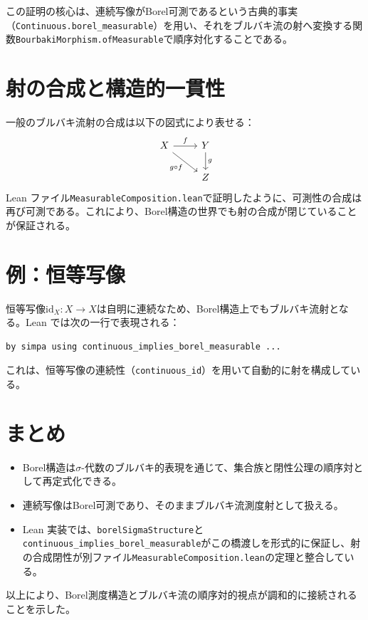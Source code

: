 \documentclass[a4paper]{ltjsarticle}
\begin{document}
この証明の核心は、連続写像がBorel可測であるという古典的事実（\verb|Continuous.borel_measurable|）を用い、それをブルバキ流の射へ変換する関数\verb|BourbakiMorphism.ofMeasurable|で順序対化することである。

\section{射の合成と構造的一貫性}
一般のブルバキ流射の合成は以下の図式により表せる：
\[
\begin{tikzcd}
X \arrow[r, "f"] \arrow[dr, "g \circ f"'] & Y \arrow[d, "g"] \\
 & Z
\end{tikzcd}
\]
Lean ファイル\texttt{MeasurableComposition.lean}で証明したように、可測性の合成は再び可測である。これにより、Borel構造の世界でも射の合成が閉じていることが保証される。

\section{例：恒等写像}
恒等写像\(\mathrm{id}_X : X \to X\)は自明に連続なため、Borel構造上でもブルバキ流射となる。Lean では次の一行で表現される：
\begin{verbatim}
by simpa using continuous_implies_borel_measurable ...
\end{verbatim}
これは、恒等写像の連続性（\verb|continuous_id|）を用いて自動的に射を構成している。

\section{まとめ}
\begin{itemize}
  \item Borel構造は\(\sigma\)-代数のブルバキ的表現を通じて、集合族と閉性公理の順序対として再定式化できる。
  \item 連続写像はBorel可測であり、そのままブルバキ流測度射として扱える。
  \item Lean 実装では、\verb|borelSigmaStructure|と\verb|continuous_implies_borel_measurable|がこの橋渡しを形式的に保証し、射の合成閉性が別ファイル\texttt{MeasurableComposition.lean}の定理と整合している。
\end{itemize}

以上により、Borel測度構造とブルバキ流の順序対的視点が調和的に接続されることを示した。
\end{document}
